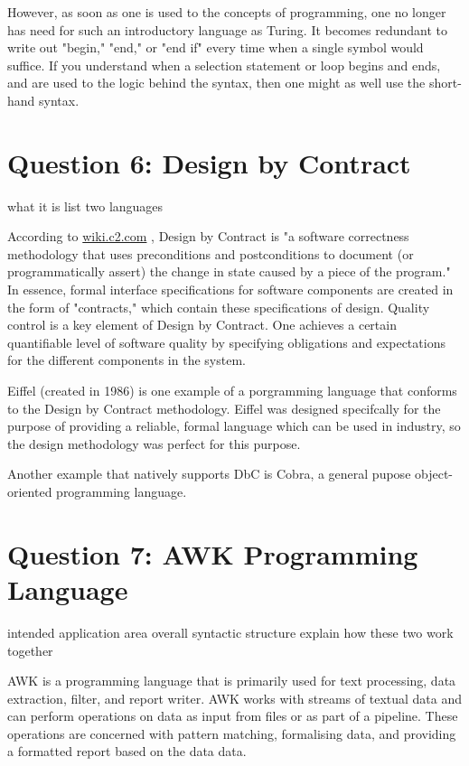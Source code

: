 \documentclass[a4paper]{article}
\begin{document}
	However, as soon as one is used to the concepts of programming, one no longer has need for such an introductory language as Turing. It becomes redundant to write out "begin," "end," or "end if" every time when a single symbol would suffice. If you understand when a selection statement or loop begins and ends, and are used to the logic behind the syntax, then one might as well use the short-hand syntax.
	
	
\section{Question 6: Design by Contract}
	what it is
	list two languages
	
	According to \url{wiki.c2.com} \cite{c2}, Design by Contract is "a software correctness methodology that uses preconditions and postconditions to document (or programmatically assert) the change in state caused by a piece of the program." In essence, formal interface specifications for software components are created in the form of "contracts," which contain these specifications of design. Quality control is a key element of Design by Contract. One achieves a certain quantifiable level of software quality by specifying obligations and expectations for the different components in the system.
	
	Eiffel (created in 1986) is one example of a porgramming language that conforms to the Design by Contract methodology. Eiffel was designed specifcally for the purpose of providing a reliable, formal language which can be used in industry, so the design methodology was perfect for this purpose. 
	
	Another example that natively supports DbC is Cobra, a general pupose object-oriented programming language.
	
\section{Question 7: AWK Programming Language}
	intended application area
	overall syntactic structure
	explain how these two work together
	
	AWK is a programming language that is primarily used for text processing, data extraction, filter, and report writer. AWK works with streams of textual data and can perform operations on data as input from files or as part of a pipeline. These operations are concerned with pattern matching, formalising data, and providing a formatted report based on the data data.
	
\end{document}
